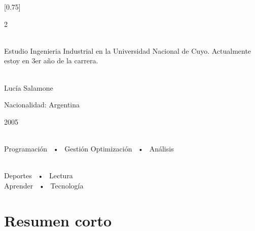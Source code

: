 \documentclass[lighthipster]{simplehipstercv}
\begin{document}
\setlength{\columnsep}{1.5cm}
[0.75]
\begin{paracol}{2}

\paracolbackgroundoptions



\footnotesize
{\setasidefontcolour
\flushright
\begin{center}
\end{center}
\\[0.5em]
Estudio Ingenieria Industrial en la Universidad Nacional de Cuyo. Actualmente estoy en 3er año de la carrera.

\bigskip

 \\[0.5em]
Lucía Salamone

Nacionalidad: Argentina 

2005

\bigskip

 \\[0.5em]

Programación ~•~ Gestión  Optimización ~•~ Análisis

\bigskip



\bigskip

\\[0.5em]

Deportes ~•~ Lectura \\ 
Aprender ~•~ Tecnología
\bigskip



\vspace{4em}

\begin{flushleft}
\end{flushleft}

\phantom{turn the page}

\phantom{turn the page}
}
\switchcolumn

\small
\section*{Resumen corto}


\end{paracol}
\end{document}
